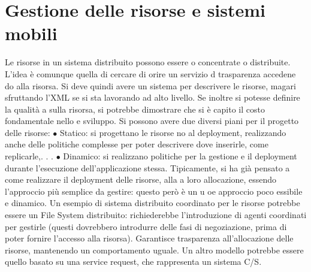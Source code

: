 \documentclass[a4paper,12pt]{article}
\begin{document}
\section{Gestione delle risorse e sistemi mobili}
Le risorse in un sistema distribuito possono essere o concentrate o distribuite.
L'idea è comunque quella di cercare di orire un servizio d trasparenza accedene
do alla risorsa.
Si deve quindi avere un sistema per descrivere le risorse, magari sfruttando
l'XML se si sta lavorando ad alto livello. Se inoltre si potesse definire la qualità
a
sulla risorsa, si potrebbe dimostrare che si è capito il costo fondamentale nello
e
sviluppo.
Si possono avere due diversi piani per il progetto delle risorse:
$\bullet$ Statico: si progettano le risorse no al deployment, realizzando anche delle
politiche complesse per poter descrivere dove inserirle, come replicarle,. . .
$\bullet$ Dinamico: si realizzano politiche per la gestione e il deployment durante
l'esecuzione dell'applicazione stessa.
Tipicamente, si ha già pensato a come realizzare il deployment delle risorse, alla
a
loro allocazione, essendo l'approccio più semplice da gestire: questo però è un
u
oe
approccio poco essibile e dinamico.
Un esempio di sistema distribuito coordinato per le risorse potrebbe essere
un File System distribuito: richiederebbe l'introduzione di agenti coordinati per
gestirle (questi dovrebbero introdurre delle fasi di negoziazione, prima di poter
fornire l'accesso alla risorsa). Garantisce trasparenza all'allocazione delle risorse,
mantenendo un comportamento uguale. Un altro modello potrebbe essere quello
basato su una service request, che rappresenta un sistema C/S.
\end{document}
